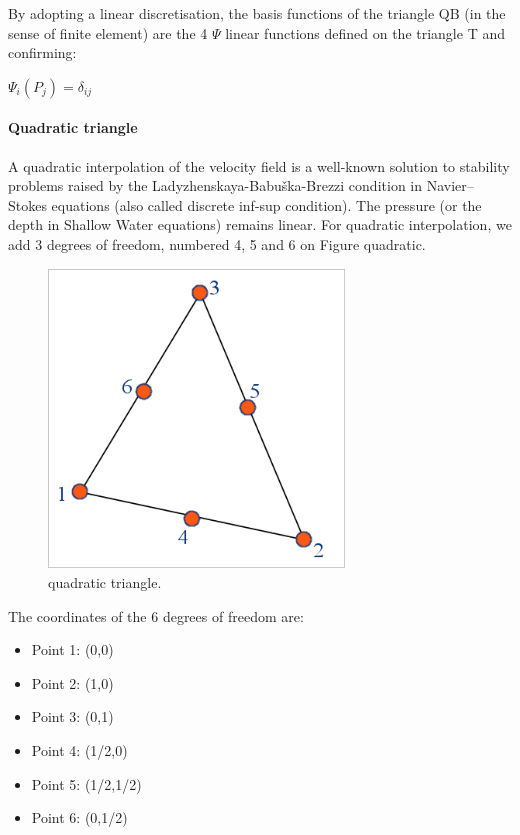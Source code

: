 By adopting a linear discretisation, the basis functions of the triangle QB (in
the sense of finite element) are the 4 $\Psi$ linear functions defined on the
triangle T and confirming:

$\Psi_{i}(P_{j})=\delta_{ij}$

\paragraph{Quadratic triangle}

A quadratic interpolation of the velocity field is a well-known solution to
stability problems raised by the Ladyzhenskaya-Babu\v{s}ka-Brezzi condition in
Navier--Stokes equations (also called discrete inf-sup condition). The pressure
(or the depth in Shallow Water equations) remains linear. For quadratic
interpolation, we add 3 degrees of freedom, numbered 4, 5 and 6 on Figure
quadratic.

\begin{figure}[H]%
\begin{center}
%
  \includegraphics[width=0.7\textwidth]{./graphics/quadratic-triangle}
%
\end{center}
\caption
{quadratic triangle.}
\label{fig:quadratic-triangle}
\end{figure}

The coordinates of the 6 degrees of freedom are:
\begin{itemize}
  \item Point 1: (0,0)
  \item Point 2: (1,0)
  \item Point 3: (0,1)
  \item Point 4: (1/2,0)
  \item Point 5: (1/2,1/2)
  \item Point 6: (0,1/2)
\end{itemize}

